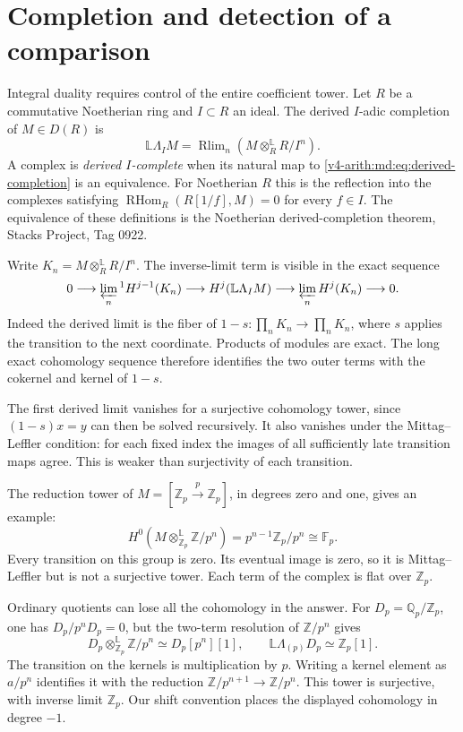 \section{Completion and detection of a comparison}
\label{v4-arith:md:sec:completion}

Integral duality requires control of the entire coefficient tower.
Let $R$ be a commutative Noetherian ring and $I\subset R$ an
ideal. The derived $I$-adic completion of $M\in D(R)$ is
\begin{equation}\label{v4-arith:md:eq:derived-completion}
 \mathbb L\Lambda_I M
 =\operatorname{Rlim}_n(M\otimes_R^{\mathbb L}R/I^n).
\end{equation}
A complex is \emph{derived $I$-complete} when its natural map
to \eqref{v4-arith:md:eq:derived-completion} is an equivalence.
For Noetherian $R$ this is the reflection into the complexes
satisfying $\operatorname{RHom}_R(R[1/f],M)=0$ for every
$f\in I$. The equivalence of these definitions is the
Noetherian derived-completion theorem, Stacks Project, Tag 0922.

Write $K_n=M\otimes_R^{\mathbb L}R/I^n$.
The inverse-limit term is visible in the exact sequence
\begin{equation}\label{v4-arith:md:eq:milnor}
 0\longrightarrow\varprojlim_n{}^1H^{j-1}(K_n)
 \longrightarrow H^j(\mathbb L\Lambda_I M)
 \longrightarrow\varprojlim_nH^j(K_n)\longrightarrow0.
\end{equation}
Indeed the derived limit is the fiber of
$1-s:\prod_nK_n\to\prod_nK_n$, where $s$ applies the
transition to the next coordinate. Products of modules are
exact. The long exact cohomology sequence therefore identifies
the two outer terms with the cokernel and kernel of $1-s$.

The first derived limit vanishes for a surjective cohomology
tower, since $(1-s)x=y$ can then be solved recursively.
It also vanishes under the Mittag--Leffler condition: for each
fixed index the images of all sufficiently late transition
maps agree. This is weaker than surjectivity of each transition.

The reduction tower of
$M=[\mathbb Z_p\xrightarrow{p}\mathbb Z_p]$, in degrees zero
and one, gives an example:
\[
 H^0(M\otimes_{\mathbb Z_p}^{\mathbb L}\mathbb Z/p^n)
 =p^{n-1}\mathbb Z_p/p^n\cong\mathbb F_p.
\]
Every transition on this group is zero. Its eventual image is
zero, so it is Mittag--Leffler but is not a surjective tower.
Each term of the complex is flat over $\mathbb Z_p$.

Ordinary quotients can lose all the cohomology in the answer.
For $D_p=\mathbb Q_p/\mathbb Z_p$, one has $D_p/p^nD_p=0$,
but the two-term resolution of $\mathbb Z/p^n$ gives
\begin{equation}\label{v4-arith:md:eq:divisible-completion}
 D_p\otimes_{\mathbb Z_p}^{\mathbb L}\mathbb Z/p^n
 \simeq D_p[p^n][1],\qquad
 \mathbb L\Lambda_{(p)}D_p\simeq\mathbb Z_p[1].
\end{equation}
The transition on the kernels is multiplication by $p$.
Writing a kernel element as $a/p^n$ identifies it with the
reduction $\mathbb Z/p^{n+1}\to\mathbb Z/p^n$.
This tower is surjective, with inverse limit $\mathbb Z_p$.
Our shift convention places the displayed cohomology in
degree $-1$.

